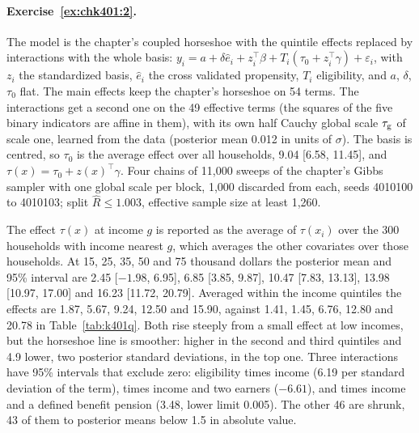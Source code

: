 \paragraph{Exercise~\ref{ex:chk401:2}.} The model is the chapter's coupled horseshoe with the quintile effects replaced by interactions with the whole basis: $y_i = a + \delta\hat e_i + z_i^\top\beta + T_i(\tau_0 + z_i^\top\gamma) + \varepsilon_i$, with $z_i$ the standardized basis, $\hat e_i$ the cross validated propensity, $T_i$ eligibility, and $a$, $\delta$, $\tau_0$ flat. The main effects keep the chapter's horseshoe on 54 terms. The interactions get a second one on the 49 effective terms (the squares of the five binary indicators are affine in them), with its own half Cauchy global scale $\tau_{\mathrm{g}}$ of scale one, learned from the data (posterior mean 0.012 in units of $\sigma$). The basis is centred, so $\tau_0$ is the average effect over all households, 9.04 [6.58, 11.45], and $\tau(x) = \tau_0 + z(x)^\top\gamma$. Four chains of 11,000 sweeps of the chapter's Gibbs sampler with one global scale per block, 1,000 discarded from each, seeds 4010100 to 4010103; split $\hat R \le 1.003$, effective sample size at least 1,260.

The effect $\tau(x)$ at income $g$ is reported as the average of $\tau(x_i)$ over the 300 households with income nearest $g$, which averages the other covariates over those households. At 15, 25, 35, 50 and 75 thousand dollars the posterior mean and 95\% interval are 2.45 [$-1.98$, 6.95], 6.85 [3.85, 9.87], 10.47 [7.83, 13.13], 13.98 [10.97, 17.00] and 16.23 [11.72, 20.79]. Averaged within the income quintiles the effects are 1.87, 5.67, 9.24, 12.50 and 15.90, against 1.41, 1.45, 6.76, 12.80 and 20.78 in Table~\ref{tab:k401q}. Both rise steeply from a small effect at low incomes, but the horseshoe line is smoother: higher in the second and third quintiles and 4.9 lower, two posterior standard deviations, in the top one. Three interactions have 95\% intervals that exclude zero: eligibility times income (6.19 per standard deviation of the term), times income and two earners ($-6.61$), and times income and a defined benefit pension (3.48, lower limit 0.005). The other 46 are shrunk, 43 of them to posterior means below 1.5 in absolute value.

